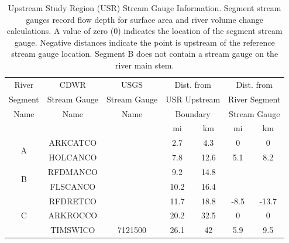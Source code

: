 \begin{table}[htbp]
\centering
  \caption[Upstream Study Region (USR) Stream Gauge Information.]{Upstream Study Region (USR) Stream Gauge Information.  Segment stream gauges record flow depth for surface area and river volume change calculations.  A value of zero (0) indicates the location of the segment stream gauge.  Negative distances indicate the point is upstream of the reference stream gauge location. Segment B does not contain a stream gauge on the river main stem.}
    \label{tab:USRGauges}
\begin{tabular}{ccccccc}
	\toprule
	                      River                       &     CDWR     &     USGS     &  \multicolumn{2}{c}{Dist. from}  &  \multicolumn{2}{c}{Dist. from}   \\
	                     Segment                      & Stream Gauge & Stream Gauge & \multicolumn{2}{c}{USR Upstream} & \multicolumn{2}{c}{River Segment} \\
	                      Name                        &     Name     &     Name     &   \multicolumn{2}{c}{Boundary}   & \multicolumn{2}{c}{Stream Gauge}  \\
	\cmidrule(r{.5em}l){4-5} \cmidrule(r{.5em}l){6-7} &              &              &  mi  &            km             &  mi  &             km             \\ \toprule
	               \multirow{2}{*}{A}                 &   ARKCATCO   &              & 2.7  &            4.3            &  0   &             0              \\
	                                                  &   HOLCANCO   &              & 7.8  &           12.6            & 5.1  &            8.2             \\ \midrule
	               \multirow{2}{*}{B}                 &   RFDMANCO   &              & 9.2  &           14.8            &      &  \\
	                                                  &   FLSCANCO   &              & 10.2 &           16.4            &      &  \\ \midrule
	               \multirow{4}{*}{C}                 &   RFDRETCO   &              & 11.7 &           18.8            & -8.5 &           -13.7            \\
	                                                  &   ARKROCCO   &              & 20.2 &           32.5            &  0   &             0              \\
	                                                  &   TIMSWICO   &   7121500    & 26.1 &            42             & 5.9  &            9.5             \\

\end{tabular}
\end{table}
